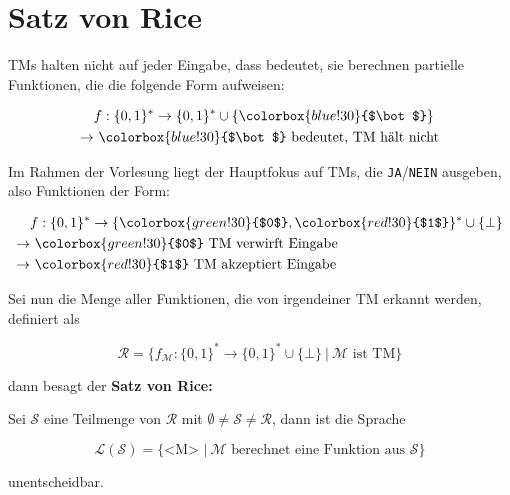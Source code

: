 \documentclass{scrartcl}%
\begin{document}

    \section*{Satz von Rice}
    TMs halten nicht auf jeder Eingabe, dass bedeutet, sie berechnen partielle Funktionen, die die folgende Form aufweisen:

    \begin{align*}
        & f : \{0,1\}^* \rightarrow \{0,1\}^* \cup \{\colorbox{blue!30}{$\bot$} \} \\
        \rightarrow &\ \colorbox{blue!30}{$\bot$} \text{ bedeutet, TM hält nicht}
    \end{align*}

    Im Rahmen der Vorlesung liegt der Hauptfokus auf TMs, die \texttt{JA}/\texttt{NEIN} ausgeben, also Funktionen der Form:

    \begin{align*}
        & f : \{0,1\}^* \rightarrow \{\colorbox{green!30}{$0$},\colorbox{red!30}{$1$}\}^* \cup \{\bot \} \\
        \rightarrow &\ \colorbox{green!30}{$0$} \text{ TM verwirft Eingabe} \\
        \rightarrow &\ \colorbox{red!30}{$1$} \text{ TM akzeptiert Eingabe}
    \end{align*}

    Sei nun die Menge aller Funktionen, die von irgendeiner TM erkannt werden, definiert als

    \begin{equation*}
        \mathcal{R} = \{f_{\mathcal{M}}: \{0,1\}^* \rightarrow \{0,1\}^* \cup \{\bot\}\ |\ \mathcal{M} \text{ ist TM} \}
    \end{equation*}

    dann besagt der
    \textbf{\textsf{Satz von Rice:}}

    \vspace*{0.3cm}
    Sei $\mathcal{S}$ eine Teilmenge von $\mathcal{R}$ mit $ \emptyset \neq \mathcal{S} \neq \mathcal{R}$, dann ist die Sprache

    \begin{equation*}
        \mathcal{L}(\mathcal{S}) = \{ \text{<M> } |\ \mathcal{M} \text{ berechnet eine Funktion aus } \mathcal{S} \}
    \end{equation*}

    unentscheidbar.\proofend
\end{document}
